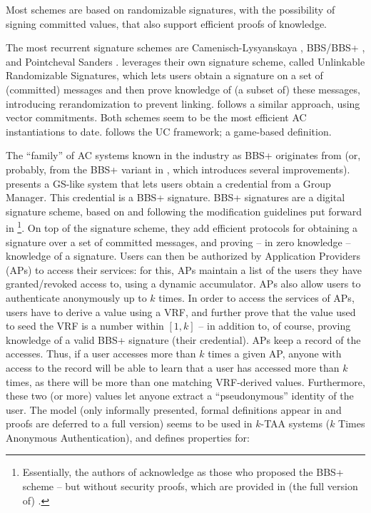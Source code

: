 Most schemes \cite{cl01,cl02,cl04,cdhk15,sms+19} are based on randomizable
signatures, with the possibility of signing committed values, that also support
efficient proofs of knowledge.

The most recurrent signature schemes are Camenisch-Lysyanskaya \cite{cl02,cl04},
BBS/BBS+ \cite{asm06,cdl16b}, and Pointcheval Sanders \cite{ps16}.
\cite{cdhk15} leverages their own signature scheme, called Unlinkable
Randomizable Signatures, which lets users obtain a signature on a set of
(committed) messages and then prove knowledge of (a subset of) these
messages, introducing rerandomization to prevent linking. \cite{fhs19}
follows a similar approach, using vector commitments. Both schemes
\cite{cdhk15,fhs19} seem to be the most efficient AC instantiations to date.
\cite{cdhk15} follows the UC framework; \cite{fhs19} a game-based definition.

The ``family'' of AC systems known in the industry as BBS+ originates from
\cite{asm06} (or, probably, from the BBS+ variant in \cite{cdl16b}, which
introduces several improvements). \cite{asm06} presents a GS-like system that
lets users obtain a credential from a Group Manager. This credential is a
BBS+ signature. BBS+ signatures are a digital signature scheme, based on
\cite{bbs04} and following the modification guidelines put forward in
\cite{cl04}\footnote{Essentially, the authors of \cite{asm06} acknowledge
  \cite{cl04} as those who proposed the BBS+ scheme -- but without security
  proofs, which are provided in (the full version of) \cite{asm06}.}. On top
of the signature scheme, they add efficient protocols for obtaining a signature
over a set of committed messages, and proving -- in zero knowledge -- knowledge
of a signature. Users can then be authorized by Application Providers (APs) to
access their services: for this, APs maintain a list of the users they have
granted/revoked access to, using a dynamic accumulator. APs also allow users to
authenticate anonymously up to $k$ times. In order to access the services of APs,
users have to derive a value using a VRF, and further prove that the value used
to seed the VRF is a number within $[1,k]$ -- in addition to, of course, proving
knowledge of a valid BBS+ signature (their credential). APs keep a record of the
accesses. Thus, if a user accesses more than $k$ times a given AP, anyone with
access to the record will be able to learn that a user has accessed more than
$k$ times, as there will be more than one matching VRF-derived values.
Furthermore, these two (or more) values let anyone extract a ``pseudonymous''
identity of the user. The model (only informally presented, formal definitions
appear in \cite{ts06} and proofs are deferred to a full version) seems to be
used in $k$-TAA systems ($k$ Times Anonymous Authentication), and defines
properties for:

